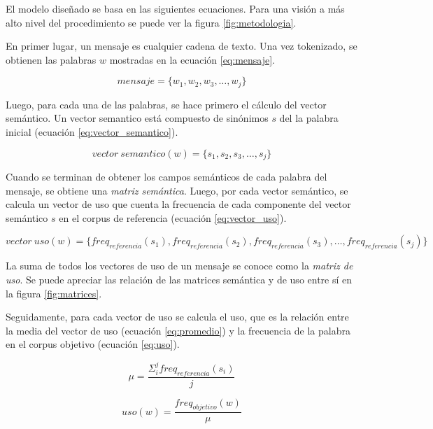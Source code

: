 \documentclass[12pt,letterpaper,twoside]{article}
\begin{document}
El modelo diseñado se basa en las siguientes ecuaciones. Para una
visión a más alto nivel del procedimiento se puede ver la figura
\ref{fig:metodologia}.

En primer lugar, un mensaje es cualquier cadena de texto. Una vez
tokenizado, se obtienen las palabras \(w\) mostradas en la ecuación
\ref{eq:mensaje}.

\begin{equation}
\label{eq:mensaje}
mensaje = \{ w_1, w_2, w_3, \dots , w_j \}
\end{equation}


 Luego, para cada una de las palabras, se hace
primero el cálculo del vector semántico. Un vector semantico está
compuesto de sinónimos \(s\) del la palabra inicial (ecuación
\ref{eq:vector_semantico}).


\begin{equation}
\label{eq:vector_semantico}
vector\ semantico(w) = \{s_1, s_2, s_3, \dots, s_j \} 
\end{equation}


Cuando se terminan de obtener los campos semánticos de cada palabra del
mensaje, se obtiene una \emph{matriz semántica}. Luego, por cada vector
semántico, se calcula un vector de uso que cuenta la frecuencia de
cada componente del vector semántico \(s\) en el corpus de referencia
(ecuación \ref{eq:vector_uso}).

\begin{equation}
\label{eq:vector_uso}
vector\ uso(w) = \{freq_{referencia}(s_1),freq_{referencia}(s_2),freq_{referencia}(s_3), \dots, freq_{referencia}(s_j) \} 
\end{equation}


La suma de todos los vectores de uso de un mensaje se conoce como la
\emph{matriz de uso}. Se puede apreciar las relación de las matrices
semántica y de uso entre sí en la figura \ref{fig:matrices}.


Seguidamente, para cada vector de uso se calcula el uso, que es la
relación entre la media del vector de uso (ecuación \ref{eq:promedio})
y la frecuencia de la palabra en el corpus objetivo (ecuación
\ref{eq:uso}).


\begin{equation}
\label{eq:promedio}
\mu = \frac{\Sigma_i^jfreq_{referencia}(s_i)}{j}
\end{equation}

\begin{equation}
\label{eq:uso}
uso(w) = \frac{freq_{objetivo}(w)}{\mu}
\end{equation}
\end{document}
